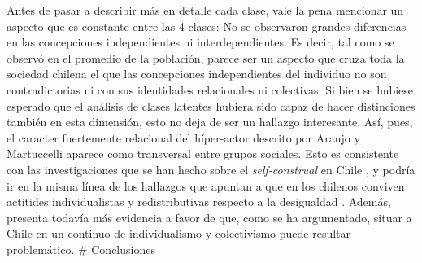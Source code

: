 \documentclass[12pt,twoside]{templates/facsothesis}
\begin{document}
Antes de pasar a describir más en detalle cada clase, vale la pena mencionar un aspecto que es constante entre las 4 clases: No se observaron grandes diferencias en las concepciones independientes ni interdependientes. Es decir, tal como se observó en el promedio de la población, parece ser un aspecto que cruza toda la sociedad chilena el que las concepciones independientes del individuo no son contradictorias ni con sus identidades relacionales ni colectivas. Si bien se hubiese esperado que el análisis de clases latentes hubiera sido capaz de hacer distinciones también en esta dimensión, esto no deja de ser un hallazgo interesante. Así, pues, el caracter fuertemente relacional del híper-actor descrito por Araujo y Martuccelli \citeyearpar{araujo2012} aparece como transversal entre grupos sociales. Esto es consistente con las investigaciones que se han hecho sobre el \emph{self-construal} en Chile \citep{benavides2020, kolstad2009}, y podría ir en la misma línea de los hallazgos que apuntan a que en los chilenos conviven actitides individualistas y redistributivas respecto a la desigualdad \citep{franetovic2023}. Además, presenta todavía más evidencia a favor de que, como se ha argumentado, situar a Chile en un continuo de individualismo y colectivismo puede resultar problemático.
\# Conclusiones


\cleardoublepage
\pagestyle{fancyplain}
\fancyhf{}
{}


\end{document}
